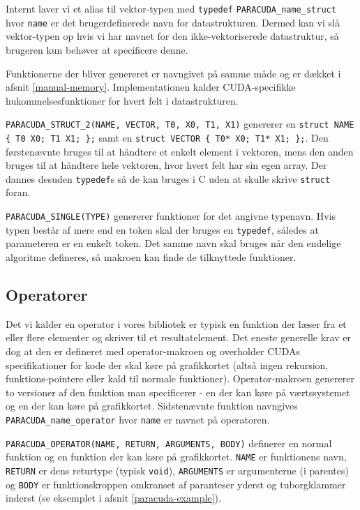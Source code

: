 Internt laver vi et alias til vektor-typen med \verb|typedef| 
\verb|PARACUDA_name_struct| hvor \verb|name| er det brugerdefinerede navn for 
datastrukturen. Dermed kan vi slå vektor-typen op hvis vi har navnet for den
ikke-vektoriserede datastruktur, så brugeren kun behøver at specificere denne.

Funktionerne der bliver genereret er navngivet på samme måde og er dækket
i afsnit \ref{manual-memory}. Implementationen kalder CUDA-specifikke 
hukommelsesfunktioner for hvert felt i datastrukturen.

\verb|PARACUDA_STRUCT_2(NAME, VECTOR, T0, X0, T1, X1)| genererer en 
\verb|struct NAME { T0 X0; T1 X1; };| samt en \verb|struct VECTOR { T0* X0; T1* X1; };|.
Den førstenævnte bruges til at håndtere et enkelt element i vektoren, mens den anden bruges til
at håndtere hele vektoren, hvor hvert felt har sin egen array. Der dannes desuden \verb|typedef|s
så de kan bruges i C uden at skulle skrive \verb|struct| foran.

\verb|PARACUDA_SINGLE(TYPE)| genererer funktioner for det angivne typenavn. Hvis typen består
af mere end en token skal der bruges en \verb|typedef|, således at parameteren er en enkelt token.
Det samme navn skal bruges når den endelige algoritme defineres, så makroen kan finde de 
tilknyttede funktioner.

\subsection{Operatorer}

Det vi kalder en operator i vores bibliotek er typisk en funktion der læser fra
et eller flere elementer og skriver til et resultatelement. Det eneste generelle
krav er dog at den er defineret med operator-makroen og overholder CUDAs 
specifikationer for kode der skal køre på grafikkortet (altså ingen rekursion, 
funktions-pointere eller kald til normale funktioner). 
Operator-makroen genererer to versioner af den funktion man specificerer -
en der kan køre på værtssystemet og en der kan køre på grafikkortet.
Sidstenævnte funktion navngives \verb|PARACUDA_name_operator| hvor \verb|name| 
er navnet på operatoren.

\verb|PARACUDA_OPERATOR(NAME, RETURN, ARGUMENTS, BODY)| definerer en normal funktion og en funktion
der kan køre på grafikkortet. \verb|NAME| er funktionens navn, \verb|RETURN| er dens returtype 
(typisk \verb|void|), \verb|ARGUMENTS| er argumenterne (i parentes) og \verb|BODY| er 
funktionskroppen omkranset af paranteser yderst og tuborgklammer inderst
(se eksemplet i afsnit \ref{paracuda-example}).

